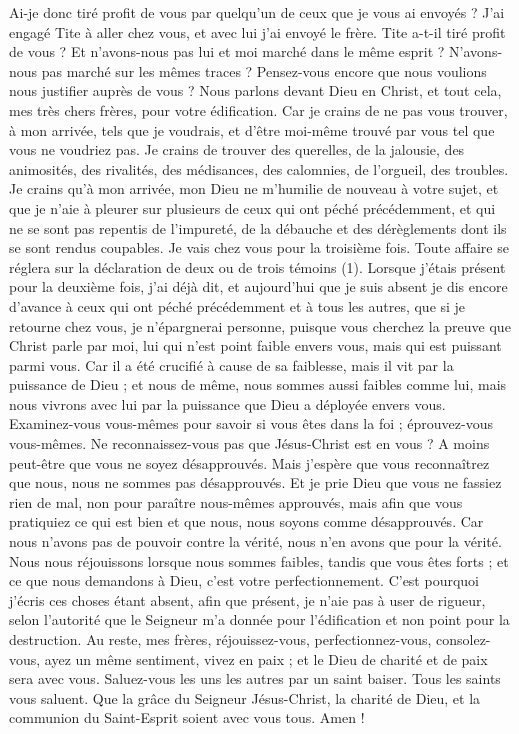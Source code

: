 \begin{multicols}{2}
Ai-je donc tiré profit de vous par quelqu’un de ceux que je vous ai envoyés ?
J'ai engagé Tite à aller chez vous, et avec lui j’ai envoyé le frère. Tite a-t-il tiré profit de vous ? Et n'avons-nous pas lui et moi marché dans le même esprit ? N'avons-nous pas marché sur les mêmes traces ?
Pensez-vous encore que nous voulions nous justifier auprès de vous ? Nous parlons devant Dieu en Christ, et tout cela, mes très chers frères, pour votre édification.
Car je crains de ne pas vous trouver, à mon arrivée, tels que je voudrais, et d’être moi-même trouvé par vous tel que vous ne voudriez pas. Je crains de trouver des querelles, de la jalousie, des animosités, des rivalités, des médisances, des calomnies, de l’orgueil, des troubles.
Je crains qu’à mon arrivée, mon Dieu ne m’humilie de nouveau à votre sujet, et que je n’aie à pleurer sur plusieurs de ceux qui ont péché précédemment, et qui ne se sont pas repentis de l’impureté, de la débauche et des dérèglements dont ils se sont rendus coupables.
\VerseOne{}Je vais chez vous pour la troisième fois. Toute affaire se réglera sur la déclaration de deux ou de trois témoins (1).
Lorsque j’étais présent pour la deuxième fois, j’ai déjà dit, et aujourd’hui que je suis absent je dis encore d’avance à ceux qui ont péché précédemment et à tous les autres, que si je retourne chez vous, je n'épargnerai personne,
puisque vous cherchez la preuve que Christ parle par moi, lui qui n'est point faible envers vous, mais qui est puissant parmi vous.
Car il a été crucifié à cause de sa faiblesse, mais il vit par la puissance de Dieu ; et nous de même, nous sommes aussi faibles comme lui, mais nous vivrons avec lui par la puissance que Dieu a déployée envers vous.
Examinez-vous vous-mêmes pour savoir si vous êtes dans la foi ; éprouvez-vous vous-mêmes. Ne reconnaissez-vous pas que Jésus-Christ est en vous ? A moins peut-être que vous ne soyez désapprouvés.
Mais j'espère que vous reconnaîtrez que nous, nous ne sommes pas désapprouvés.
Et je prie Dieu que vous ne fassiez rien de mal, non pour paraître nous-mêmes approuvés, mais afin que vous pratiquiez ce qui est bien et que nous, nous soyons comme désapprouvés.
Car nous n’avons pas de pouvoir contre la vérité, nous n’en avons que pour la vérité.
Nous nous réjouissons lorsque nous sommes faibles, tandis que vous êtes forts ; et ce que nous demandons à Dieu, c’est votre perfectionnement.
C'est pourquoi j'écris ces choses étant absent, afin que présent, je n’aie pas à user de rigueur, selon l’autorité que le Seigneur m'a donnée pour l'édification et non point pour la destruction.
Au reste, mes frères, réjouissez-vous, perfectionnez-vous, consolez-vous, ayez un même sentiment, vivez en paix ; et le Dieu de charité et de paix sera avec vous.
Saluez-vous les uns les autres par un saint baiser. Tous les saints vous saluent.
Que la grâce du Seigneur Jésus-Christ, la charité de Dieu, et la communion du Saint-Esprit soient avec vous tous. Amen !
\PPE{}
\end{multicols}
